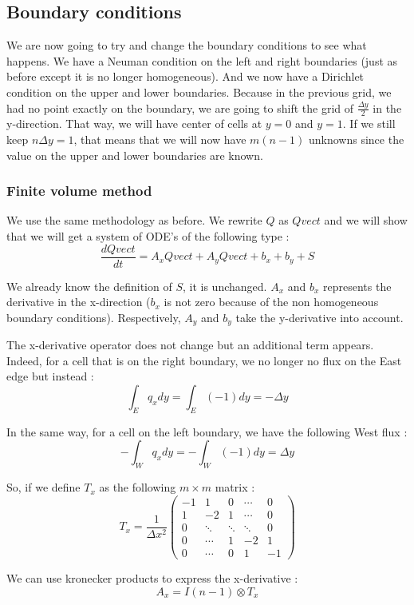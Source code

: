 \subsection{Boundary conditions}
We are now going to try and change the boundary conditions to see what happens. We have a Neuman condition on the left and right boundaries (just as before except it is no longer homogeneous). And we now have a Dirichlet condition on the upper and lower boundaries. Because in the previous grid, we had no point exactly on the boundary, we are going to shift the grid of $\frac{\Delta y}{2}$ in the y-direction. That way, we will have center of cells at $y=0$ and $y=1$. If we still keep $n\Delta y =1$, that means that we will now have $m(n-1)$ unknowns since the value on the upper and lower boundaries are known.

\subsubsection{Finite volume method}
We use the same methodology as before. We rewrite $Q$ as $Qvect$ and we will show that we will get a system of ODE's of the following type : 
$$\frac{dQvect}{dt} = A_xQvect+A_yQvect+b_x+b_y+S$$

We already know the definition of $S$, it is unchanged. $A_x$ and $b_x$ represents the derivative in the x-direction ($b_x$ is not zero because of the non homogeneous boundary conditions). Respectively, $A_y$ and $b_y$ take the y-derivative into account.

The x-derivative operator does not change but an additional term appears. Indeed, for a cell that is on the right boundary, we no longer no flux on the East edge but instead : 
$$\int_E q_xdy = \int_E (-1)dy = -\Delta y$$ 

In the same way, for a cell on the left boundary, we have the following West flux :
$$-\int_Wq_xdy=-\int_W(-1)dy = \Delta y$$

So, if we define $T_x$ as the following $m\times m$ matrix :
$$T_x = \frac{1}{\Delta x^2}\left(\begin{array}{ccccc}
-1 & 1 & 0 & \cdots & 0 \\ 
1 & -2 & 1 & \cdots & 0 \\ 
0& \ddots & \ddots & \ddots & 0 \\ 
0 & \cdots & 1 & -2 & 1 \\
0 & \cdots & 0 & 1 & -1
\end{array}\right) $$

We can use kronecker products to express the x-derivative :
$$A_x = I(n-1)\otimes T_x$$

